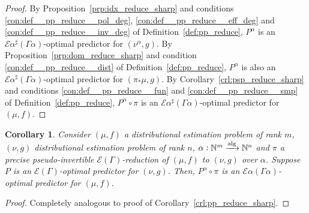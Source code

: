 \documentclass{article}
\numberwithin{equation}{section}
\theoremstyle{definition}
\theoremstyle{plain}
\newtheorem{corollary}{Corollary}[section]
\newcommand{\Nats}{\mathbb{N}}
\newcommand{\Fall}{\mathcal{E}}
\newcommand{\EG}{\Fall(\Gamma)}
\newcommand{\Alg}{\xrightarrow{\textnormal{alg}}}
\begin{document}
\begin{proof}

By Proposition~\ref{prp:idx_reduce_sharp} and conditions \ref{con:def__pp_reduce__pol_deg}, \ref{con:def__pp_reduce__eff_deg} and \ref{con:def__pp_reduce__inv_deg} of Definition~\ref{def:pp_reduce}, ${P^\alpha}$ is an ${\Fall \alpha^\sharp(\Gamma \alpha)}$-optimal predictor for ${(\nu^\alpha, g)}$. By Proposition~\ref{prp:dom_reduce_sharp} and condition \ref{con:def__pp_reduce__dist} of Definition~\ref{def:pp_reduce}, ${P^\alpha}$ is also an ${\Fall \alpha^\sharp(\Gamma \alpha)}$-optimal predictor for ${(\pi_* \mu, g)}$. By Corollary~\ref{crl:psp_reduce_sharp} and conditions \ref{con:def__pp_reduce__fun} and \ref{con:def__pp_reduce__smp} of Definition~\ref{def:pp_reduce}, ${P^\alpha \circ \pi}$ is an ${\Fall \alpha^\sharp(\Gamma \alpha)}$-optimal predictor for ${(\mu, f)}$.
%
\end{proof}

\begin{samepage}
\begin{corollary}

Consider $(\mu,f)$ a distributional estimation problem of rank ${m}$, $(\nu,g)$ distributional estimation problem of rank ${n}$, ${\alpha: \Nats^m \Alg \Nats^n}$ and $\pi$ a precise pseudo-invertible $\EG$-reduction of $(\mu, f)$ to $(\nu, g)$ over ${\alpha}$. Suppose $P$ is an $\EG$-optimal predictor for $(\nu, g)$. Then, $P^\alpha \circ \pi$ is an $\Fall \alpha (\Gamma \alpha)$-optimal predictor for $(\mu, f)$.

\end{corollary}
\end{samepage}

\begin{proof}

Completely analogous to proof of Corollary~\ref{crl:pp_reduce_sharp}.
%
\end{proof}
\end{document}
